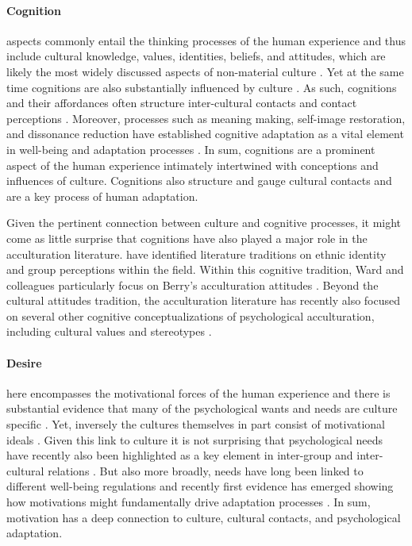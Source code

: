 \documentclass[nobib]{tufte-handout}
\begin{document}
\paragraph{Cognition}aspects commonly entail the thinking processes of the human experience and thus include cultural knowledge, values, identities, beliefs, and attitudes, which are likely the most widely discussed aspects of non-material culture \citep[e.g.,][]{DiMaggio1997}. Yet at the same time cognitions are also substantially influenced by culture \citep[e.g.,][]{Gelfand2011, Nisbett2002}. As such, cognitions and their affordances often structure inter-cultural contacts \citep[e.g., values;][]{Ramstead2016} and contact perceptions \citep[e.g., out-group attitudes;][]{Stephan2000a}. Moreover, processes such as meaning making, self-image restoration, and dissonance reduction have established cognitive adaptation as a vital element in well-being and adaptation processes \citep[e.g.,][]{Czajkowska2017}. In sum, cognitions are a prominent aspect of the human experience intimately intertwined with conceptions and influences of culture. Cognitions also structure and gauge cultural contacts and are a key process of human adaptation.

Given the pertinent connection between culture and cognitive processes, it might come as little surprise that cognitions have also played a major role in the acculturation literature. \citet{Ward2001} have identified literature traditions on ethnic identity and group perceptions within the field. Within this cognitive tradition, Ward and colleagues particularly focus on Berry's \citeyear{Berry1997b} acculturation attitudes \citep{Ward2019}. Beyond the cultural attitudes tradition, the acculturation literature has recently also focused on several other cognitive conceptualizations of psychological acculturation, including cultural values \citep[e.g.,][]{Marin2003} and stereotypes \citep[e.g.,][]{Stanciu2018}. 

\paragraph{Desire} here encompasses the motivational forces of the human experience and there is substantial evidence that many of the psychological wants and needs are culture specific \citep[e.g.,][]{McInerney2016, Morling2017}. Yet, inversely the cultures themselves in part consist of motivational ideals \citep[or oughts; e.g., see][]{Markus1991}. Given this link to culture it is not surprising that psychological needs have recently also been highlighted as a key element in inter-group and inter-cultural relations \citep{Dovidio2017, Kitayama2007, Hassler2021, Shnabel2008a}. But also more broadly, needs have long been linked to different well-being regulations \citep[e.g.,][]{Steverink2006} and recently first evidence has emerged showing how motivations might fundamentally drive adaptation processes \citep{Dignath2020}. 
In sum, motivation has a deep connection to culture, cultural contacts, and psychological adaptation.
\end{document}
